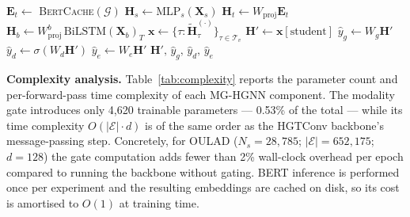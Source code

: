 \documentclass[sigconf]{acmart}
\begin{document}
\begin{algorithm}[t]
\DontPrintSemicolon
\caption{MG-HGNN Forward Pass}
\label{alg:forward}
$\mathbf{E}_t \leftarrow$
  \textsc{BertCache}$(\mathcal{G})$
  \;
$\mathbf{H}_s \leftarrow \text{MLP}_s(\mathbf{X}_s)$
  \;
$\mathbf{H}_t \leftarrow
  W_{\text{proj}} \mathbf{E}_t$
  \;
$\mathbf{H}_b \leftarrow
  W_{\text{proj}}^b\,\text{BiLSTM}(\mathbf{X}_b)_T$
  \;
\BlankLine
{}
\BlankLine
{}
$\mathbf{x} \leftarrow
  \{\tau : \tilde{\mathbf{H}}^{(\cdot)}_\tau\}
  _{\tau \in \mathcal{T}_v}$\;
$\mathbf{H}' \leftarrow \mathbf{x}[\text{student}]$\;
\BlankLine
{}
$\hat{y}_g \leftarrow W_g \mathbf{H}'$\;
$\hat{y}_d \leftarrow \sigma(W_d \mathbf{H}')$\;
$\hat{y}_e \leftarrow W_e \mathbf{H}'$\;
\Return $\mathbf{H}',\,\hat{y}_g,\,\hat{y}_d,\,
  \hat{y}_e$\;
\end{algorithm}

\textbf{Complexity analysis.}
Table~\ref{tab:complexity} reports the parameter
count and per-forward-pass time complexity of each
MG-HGNN component. The modality gate introduces
only 4,620 trainable parameters --- 0.53\% of the
total --- while its time complexity $O(|\mathcal{E}|
\cdot d)$ is of the same order as the HGTConv
backbone's message-passing step. Concretely, for
OULAD ($N_s {=} 28{,}785$; $|\mathcal{E}|
{=} 652{,}175$; $d {=} 128$) the gate computation
adds fewer than 2\% wall-clock overhead per epoch
compared to running the backbone without gating.
BERT inference is performed once per experiment and
the resulting embeddings are cached on disk, so its
cost is amortised to $O(1)$ at training time.
\end{document}
